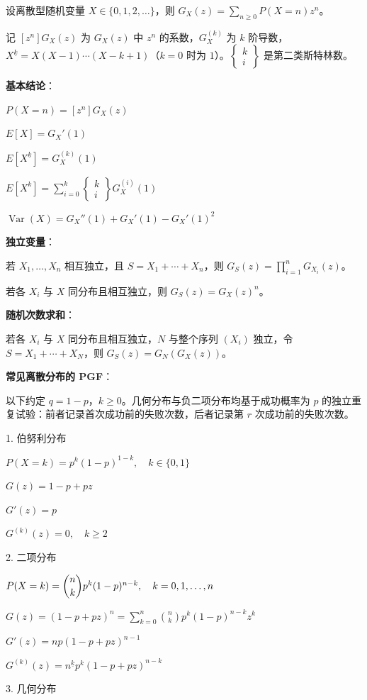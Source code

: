 设离散型随机变量 $X\in\{0,1,2,\dots\}$，则 $G_X(z)=\sum_{n\ge0}P(X=n)z^n$。

记 $[z^n]G_X(z)$ 为 $G_X(z)$ 中 $z^n$ 的系数，$G_X^{(k)}$ 为 $k$ 阶导数，$X^{\underline k}=X(X-1)\cdots(X-k+1)$（$k=0$ 时为 $1$）。$\begin{Bmatrix}k\\i\end{Bmatrix}$ 是第二类斯特林数。

\textbf{基本结论}：

$P(X=n)=[z^n]G_X(z)$

$E[X]=G_X'(1)$

$E[X^{\underline k}]=G_X^{(k)}(1)$

$E[X^k]=\sum_{i=0}^k\begin{Bmatrix}k\\i\end{Bmatrix}G_X^{(i)}(1)$

$\operatorname{Var}(X)=G_X''(1)+G_X'(1)-G_X'(1)^2$

\textbf{独立变量}：

若 $X_1,\dots,X_n$ 相互独立，且 $S=X_1+\cdots+X_n$，则 $G_S(z)=\prod_{i=1}^nG_{X_i}(z)$。

若各 $X_i$ 与 $X$ 同分布且相互独立，则 $G_S(z)=G_X(z)^n$。

\textbf{随机次数求和}：

若各 $X_i$ 与 $X$ 同分布且相互独立，$N$ 与整个序列 $(X_i)$ 独立，令 $S=X_1+\cdots+X_N$，则 $G_S(z)=G_N(G_X(z))$。

\textbf{常见离散分布的 PGF}：

以下约定 $q=1-p$，$k\ge0$。几何分布与负二项分布均基于成功概率为 $p$ 的独立重复试验：前者记录首次成功前的失败次数，后者记录第 $r$ 次成功前的失败次数。


1. 伯努利分布

$P(X=k)=p^k(1-p)^{1-k},\quad k\in\{0,1\}$

$G(z)=1-p+pz$

$G'(z)=p$

$G^{(k)}(z)=0,\quad k\ge 2$

2. 二项分布

$P(X=k)=\dbinom{n}{k}p^k(1-p)^{n-k},\quad k=0,1,\dots,n$

$G(z)=(1-p+pz)^n=\displaystyle\sum_{k=0}^{n}\binom{n}{k}p^k(1-p)^{n-k}z^k$

$G'(z)=np(1-p+pz)^{n-1}$

$G^{(k)}(z)=n^{\underline{k}}p^k(1-p+pz)^{n-k}$

3. 几何分布

